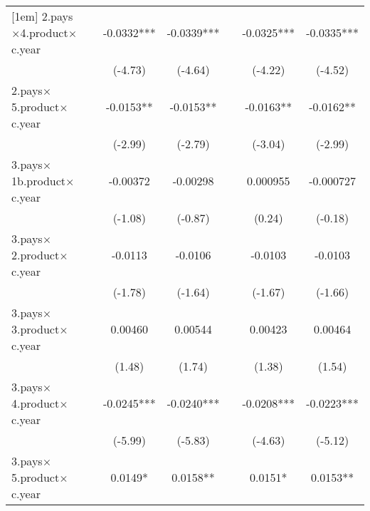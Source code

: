 {\begin{tabular}{l*{6}{c}}
[1em]
2.pays$\times$4.product$\times$c.year&                     &     -0.0332***&     -0.0339***&                     &     -0.0325***&     -0.0335***\\
                    &                     &     (-4.73)         &     (-4.64)         &                     &     (-4.22)         &     (-4.52)         \\
[1em]
2.pays$\times$5.product$\times$c.year&                     &     -0.0153** &     -0.0153** &                     &     -0.0163** &     -0.0162** \\
                    &                     &     (-2.99)         &     (-2.79)         &                     &     (-3.04)         &     (-2.99)         \\
[1em]
3.pays$\times$1b.product$\times$c.year&                     &    -0.00372         &    -0.00298         &                     &    0.000955         &   -0.000727         \\
                    &                     &     (-1.08)         &     (-0.87)         &                     &      (0.24)         &     (-0.18)         \\
[1em]
3.pays$\times$2.product$\times$c.year&                     &     -0.0113         &     -0.0106         &                     &     -0.0103         &     -0.0103         \\
                    &                     &     (-1.78)         &     (-1.64)         &                     &     (-1.67)         &     (-1.66)         \\
[1em]
3.pays$\times$3.product$\times$c.year&                     &     0.00460         &     0.00544         &                     &     0.00423         &     0.00464         \\
                    &                     &      (1.48)         &      (1.74)         &                     &      (1.38)         &      (1.54)         \\
[1em]
3.pays$\times$4.product$\times$c.year&                     &     -0.0245***&     -0.0240***&                     &     -0.0208***&     -0.0223***\\
                    &                     &     (-5.99)         &     (-5.83)         &                     &     (-4.63)         &     (-5.12)         \\
[1em]
3.pays$\times$5.product$\times$c.year&                     &      0.0149*  &      0.0158** &                     &      0.0151*  &      0.0153** \\

\end{tabular}}
